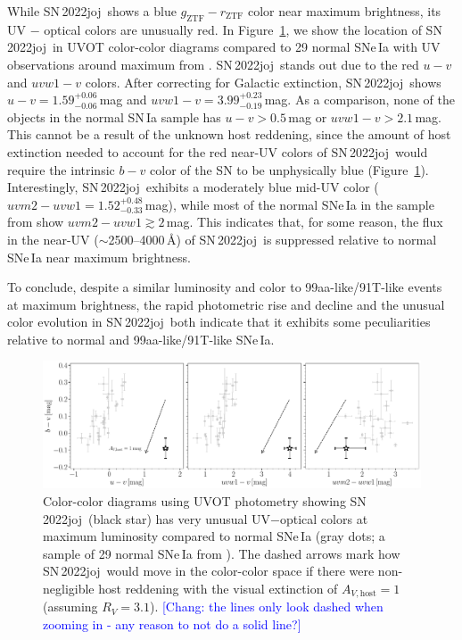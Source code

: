 \documentclass[twocolumn]{aastex631}
\newcommand{\sn}{SN\,2022joj}
\newcommand{\chang}[1]{\textcolor{blue}{[Chang: #1]}}
\begin{document}
\begin{CJK*}{UTF8}{gbsn}
While \sn\ shows a blue $g_\mathrm{ZTF}-r_\mathrm{ZTF}$ color near maximum brightness, its UV $-$ optical colors are unusually red. In Figure~\ref{fig:UVOT}, we show the location of \sn\ in UVOT color-color diagrams compared to 29 normal SNe\,Ia with UV observations around maximum from \citet{Brown_2018}. \sn\ stands out due to the red $u-v$ and $uvw1-v$ colors. After correcting for Galactic extinction, \sn\ shows $u-v=1.59^{+0.06}_{-0.06}$\,mag and $uvw1 - v=3.99^{+0.23}_{-0.19}$\,mag. As a comparison, none of the objects in the normal SN\,Ia sample has $u-v>0.5$\,mag or $uvw1 - v>2.1$\,mag. This cannot be a result of the unknown host reddening, since the amount of host extinction needed to account for the red near-UV colors of \sn\ would require the intrinsic $b-v$ color of the SN to be unphysically blue (Figure~\ref{fig:UVOT}). Interestingly, \sn\ exhibits a moderately blue mid-UV color ($uvm2-uvw1=1.52^{+0.48}_{-0.33}$\,mag), while most of the normal SNe\,Ia in the sample from \citet{Brown_2018} show $uvm2-uvw1\gtrsim2$\,mag. This indicates that, for some reason, the flux in the near-UV ($\sim$2500--4000\,\r{A}) of \sn\ is suppressed relative to normal SNe\,Ia near maximum brightness.

To conclude, despite a similar luminosity and color to 99aa-like/91T-like events at maximum brightness, the rapid photometric rise and decline and the unusual color evolution in \sn\ both indicate that it exhibits some peculiarities relative to normal and 99aa-like/91T-like SNe\,Ia.

\begin{figure}
    \centering
    \includegraphics[width=\linewidth]{UVOT_colors.pdf}
    \caption{Color-color diagrams using UVOT photometry showing \sn\ (black star) has very unusual UV$-$optical colors at maximum luminosity compared to normal SNe\,Ia (gray dots; a sample of 29 normal SNe\,Ia from \citealp{Brown_2018}). The dashed arrows mark how \sn\ would move in the color-color space if there were non-negligible host reddening with the visual extinction of $A_{V,\mathrm{host}}=1$ (assuming $R_V=3.1$). \chang{the lines only look dashed when zooming in - any reason to not do a solid line?}
    }
    \label{fig:UVOT}
\end{figure}



\end{CJK*}
\end{document}
